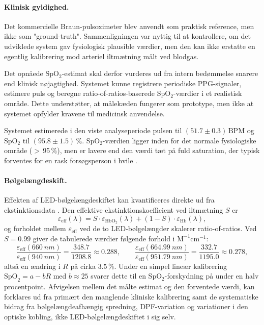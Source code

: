 \paragraph{Klinisk gyldighed.}
Det kommercielle Braun-pulsoximeter blev anvendt som praktisk reference, men ikke som "ground-truth". Sammenligningen var nyttig til at kontrollere, om det udviklede system gav fysiologisk plausible værdier, men den kan ikke erstatte en egentlig kalibrering mod arteriel iltmætning målt ved blodgas.

Det opnåede SpO$_2$-estimat skal derfor vurderes ud fra intern bedømmelse snarere end klinisk nøjagtighed. Systemet kunne registrere periodiske PPG-signaler, estimere puls og beregne ratio-of-ratios-baserede SpO$_2$-værdier i et realistisk område. Dette understøtter, at målekæden fungerer som prototype, men ikke at systemet opfylder kravene til medicinsk anvendelse.

Systemet estimerede i den viste analyseperiode pulsen til $(51.7 \pm 0.3)\,\mathrm{BPM}$ og SpO$_2$ til $(95.8 \pm 1.5)\,\%$. SpO$_2$-værdien ligger inden for det normale fysiologiske område ($>$\,95\,\%), men er lavere end den værdi tæt på fuld saturation, der typisk forventes for en rask forsøgsperson i hvile \cite{Webster1997,Nitzan2014}.

\paragraph{Bølgelængdeskift.}
Effekten af LED-bølgelængdeskiftet kan kvantificeres direkte ud fra ekstinktionsdata \cite{Prahl1998}. Den effektive ekstinktionskoefficient ved iltmætning $S$ er
\begin{equation}
\varepsilon_{\mathrm{eff}}(\lambda) = S \cdot \varepsilon_{\mathrm{HbO}_2}(\lambda) + (1-S) \cdot \varepsilon_{\mathrm{Hb}}(\lambda),
\label{eq:epsilon_eff}
\end{equation}
og forholdet mellem $\varepsilon_{\mathrm{eff}}$ ved de to LED-bølgelængder skalerer ratio-of-ratios. Ved $S = 0.99$ giver de tabulerede værdier følgende forhold i $\mathrm{M}^{-1}\mathrm{cm}^{-1}$:
\begin{equation}
\frac{\varepsilon_{\mathrm{eff}}(\SI{660}{nm})}{\varepsilon_{\mathrm{eff}}(\SI{940}{nm})} = \frac{348.7}{1208.8} \approx 0.288,
\qquad
\frac{\varepsilon_{\mathrm{eff}}(\SI{664.99}{nm})}{\varepsilon_{\mathrm{eff}}(\SI{951.79}{nm})} = \frac{332.7}{1195.0} \approx 0.278,
\label{eq:prahl_ratio}
\end{equation}
altså en ændring i $R$ på cirka $3.5\,\%$. Under en simpel lineær kalibrering $\mathrm{SpO}_2 = a - bR$ med $b \approx 25$ \cite{Webster1997} svarer dette til en SpO$_2$-forskydning på under en halv procentpoint. Afvigelsen mellem det målte estimat og den forventede værdi, kan forklares ud fra primært den manglende kliniske kalibrering samt de systematiske bidrag fra bølgelængdeafhængig spredning, DPF-variation og variationer i den optiske kobling, ikke LED-bølgelængdeskiftet i sig selv.

